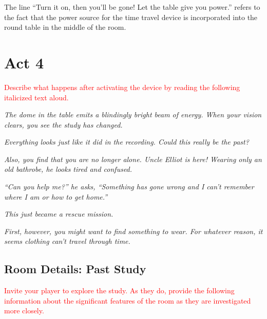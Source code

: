 \documentclass[a6paper, parskip=half, DIV=14, 12pt]{scrartcl}
\begin{document}
The line ``Turn it on, then you'll be gone! Let the table give you power.'' refers to the fact that the power source for the time travel device is incorporated into the round table in the middle of the room. 

\newpage

\section*{Act 4}
\textcolor{Red}{Describe what happens after activating the device by reading the following italicized text aloud. }

\textit{The dome in the table emits a blindingly bright beam of energy. When your vision clears, you see the study has changed.}

\textit{Everything looks just like it did in the recording. Could this really be the past?}

\textit{Also, you find that you are no longer alone. Uncle Elliot is here! Wearing only an old bathrobe, he looks tired and confused.}

\textit{``Can you help me?'' he asks, ``Something has gone wrong and I can't remember where I am or how to get home.''}

\textit{This just became a rescue mission.}

\textit{First, however, you might want to find something to wear. For whatever reason, it seems clothing can't travel through time.}

\newpage

\subsection*{Room Details: Past Study}
\textcolor{Red}{Invite your player to explore the study. As they do, provide the following information about the significant features of the room as they are investigated more closely.}
\end{document}
